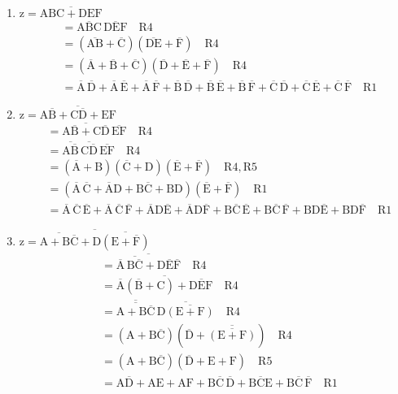 \documentclass[a4paper]{article}
\begin{document}
\begin{enumerate}[label=(\alph*)]
	\item $\mathrm{z = \overline{ABC + DEF}}$
	\begin{align*}
		&= \mathrm{\overline{ABC}\,\overline{DEF}\quad R4}\\
		&= \mathrm{(\overline{AB} + \overline{C})(\overline{DE} + \overline{F})\quad R4}\\
		&= \mathrm{(\overline{A} + \overline{B} + \overline{C})(\overline{D} + \overline{E} + \overline{F})\quad R4}\\
		&= \mathrm{\overline{A}\,\overline{D} + \overline{A}\,\overline{E} + \overline{A}\,\overline{F} + \overline{B}\,\overline{D} + \overline{B}\,\overline{E} + \overline{B}\,\overline{F} + \overline{C}\,\overline{D} + \overline{C}\,\overline{E} + \overline{C}\,\overline{F}\quad R1}
	\end{align*}
	
	\item $\mathrm{z = \overline{A\overline{B} + C\overline{D} + EF}}$
	\begin{align*}
		&= \mathrm{\overline{A\overline{B} + C\overline{D}}\,\overline{EF}\quad R4}\\
		&= \mathrm{\overline{A\overline{B}}\,\overline{C\overline{D}}\,\overline{EF}\quad R4}\\
		&= \mathrm{(\overline{A} + B)(\overline{C} + D)(\overline{E} + \overline{F})\quad R4, R5}\\
		&= \mathrm{(\overline{A}\,\overline{C} + \overline{A}D + B\overline{C} + BD)(\overline{E} + \overline{F})\quad R1}\\
		&= \mathrm{\overline{A}\,\overline{C}\,\overline{E} + \overline{A}\,\overline{C}\,\overline{F} + \overline{A}D\overline{E} + \overline{A}D\overline{F} + B\overline{C}\,\overline{E} + B\overline{C}\,\overline{F} + BD\overline{E} + BD\overline{F}\quad R1}
	\end{align*}
	
	\item $\mathrm{z = \overline{\overline{A + B\overline{C}} + D\overline{(E + \overline{F})}}}$
	\begin{align*}
		&= \mathrm{\overline{\overline{A}\,\overline{B\overline{C}} + D\overline{E}\overline{F}}\quad R4}\\
		&= \mathrm{\overline{\overline{A}(\overline{B} + C) + D\overline{E}F}\quad R4}\\
		&= \mathrm{\overline{\overline{A+B\overline{C}}}\,\overline{D\overline{(E+F)}}\quad R4}\\
		&= \mathrm{(A+B\overline{C})(\overline{D} + \overline{\overline{(E+F)}})\quad R4}\\
		&= \mathrm{(A + B\overline{C})(\overline{D} + E + F)\quad R5}\\
		&= \mathrm{A\overline{D} + AE + AF + B\overline{C}\,\overline{D} + B\overline{C}E + B\overline{C}\,\overline{F}\quad R1}
	\end{align*}
\end{enumerate}
\end{document}
